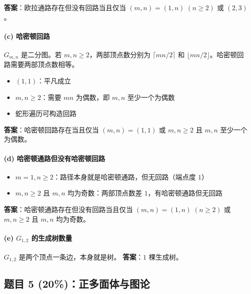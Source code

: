 \documentclass[10pt,a4paper,openany]{ctexbook}
\theoremstyle{definition}
\theoremstyle{remark}
\begin{document}
\textbf{答案}：欧拉通路存在但没有回路当且仅当 $(m,n) = (1, n)\;(n \ge 2)$ 或 $(2,3)$。
\vspace{-2pt}

\paragraph{(c) 哈密顿回路}

$G_{m,n}$ 是二分图。若 $m,n \ge 2$，两部顶点数分别为 $\lceil mn/2\rceil$ 和 $\lfloor mn/2\rfloor$。哈密顿回路需要两部顶点数相等。
\begin{itemize}
\item $(1,1)$：平凡成立
\item $m,n \ge 2$：需要 $mn$ 为偶数，即 $m,n$ 至少一个为偶数
\item 蛇形遍历可构造回路

\end{itemize}

\textbf{答案}：哈密顿回路存在当且仅当 $(m,n) = (1,1)$ 或 $m,n \ge 2$ 且 $m,n$ 至少一个为偶数。
\vspace{-2pt}

\paragraph{(d) 哈密顿通路但没有哈密顿回路}

\begin{itemize}
\item $m = 1, n \ge 2$：路径本身就是哈密顿通路，但无回路（端点度 $1$）
\item $m,n \ge 2$ 且 $m,n$ 均为奇数：两部顶点数差 $1$，有哈密顿通路但无回路

\end{itemize}

\textbf{答案}：哈密顿通路存在但没有回路当且仅当 $(m,n) = (1, n)\;(n \ge 2)$ 或 $m,n \ge 2$ 且 $m,n$ 均为奇数。
\vspace{-2pt}

\paragraph{(e) $G_{1,2}$ 的生成树数量}

$G_{1,2}$ 是两个顶点一条边，本身就是树。
\textbf{答案}：$\boxed{1}$ 棵生成树。
\vspace{-2pt}

\subsection{题目 5 (20\%)：正多面体与图论}
\end{document}
